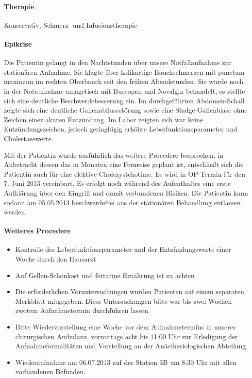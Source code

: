 \documentclass[
ngerman,
paper=a4,
asymmetric,
fontsize=10pt,
draft=false,
numbers=noenddot,
bibtotocnumbered,
footnotes=multiple,
]{scrreprt}
\begin{document}
\paragraph{Therapie} Konservativ, Schmerz- und Infusionstherapie


\paragraph{Epikrise}

Die Patientin gelangt in den 
Nachtstunden über unsere Notfallaufnahme zur stationären
Aufnahme. Sie klagte über kolikartige Bauchschmerzen
mit punctum maximum im rechten Oberbauch seit den
frühen Abendstunden. Sie wurde noch in der Notaufnahme
anlagetisch mit Buscopan und Novalgin behandelt, es stellte sich eine deutliche
Beschwerdebesserung ein. Im durchgeführten Abdomen-Schall zeigte
sich eine deutliche Gallenabflussstörung sowie eine
Sludge-Gallenblase ohne Zeichen einer akuten Entzündung. 
Im Labor zeigten sich war keine
Entzündungszeichen, jedoch geringfügig erhöhte
Leberfunktionsparameter und Cholestasewerte. 

Mit der
Patientin wurde ausführlich das weitere Procedere
besprochen, in Anbetracht dessen das in   Monaten eine
Fernreise geplant ist, entschließt sich die Patientin auch
für eine elektive Cholezystekotime. Es wird in OP-Termin
für den 7. Juni 2013 vereinbart. Es erfolgt noch während des Aufenthaltes
eine erste Aufklärung über den Eingriff und damit
verbundenen Risiken. Die Patientin kann sodann am 05.05.2013
beschwerdefrei aus der stationären Behandlung entlassen werden.

\paragraph{Weiteres Procedere} 

\begin{itemize}
  \item Kontrolle der Leberfunktionsparameter und
der Entzündungswerte einer Woche durch den Hausarzt
\item Auf Gellen-Schonkost und fettarme Ernährung ist zu
achten
\item 
Die erforderlichen Voruntersuchungen wurden Patienten
auf einem separaten Merkblatt mitgegeben. Diese
Untersuchungen bitte war bis zwei Wochen zwotem
Aufnahmetermin durchführen lassen.
\item Bitte Wiedervorstellung
eine Woche vor dem Aufnahmetermins in unserer chirurgischen
Ambulanz, vormittags acht bis 11:00 Uhr zur Erledigung der
Aufnahmeformalitäten und Vorstellung an der
Anästhesiologischen Abteilung.
\item Wiederaufnahme am
06.07.2013 auf der Station 3B um 8:30 Uhr mit allen
vorhandenen Befunden.
\end{itemize}
\end{document}
